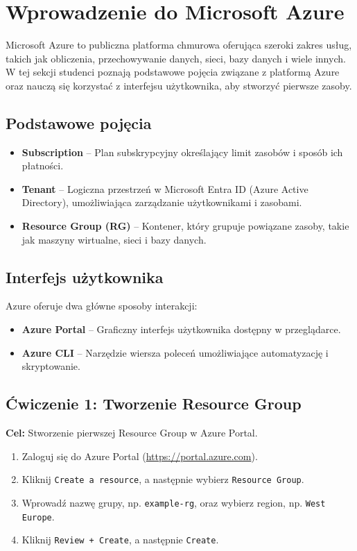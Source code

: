 \documentclass{article}
\begin{document}
\section{Wprowadzenie do Microsoft Azure}
Microsoft Azure to publiczna platforma chmurowa oferująca szeroki zakres usług, takich jak obliczenia, przechowywanie danych, sieci, bazy danych i wiele innych. W tej sekcji studenci poznają podstawowe pojęcia związane z platformą Azure oraz nauczą się korzystać z interfejsu użytkownika, aby stworzyć pierwsze zasoby.

\subsection{Podstawowe pojęcia}
\begin{itemize}
    \item \textbf{Subscription} – Plan subskrypcyjny określający limit zasobów i sposób ich płatności.
    \item \textbf{Tenant} – Logiczna przestrzeń w Microsoft Entra ID (Azure Active Directory), umożliwiająca zarządzanie użytkownikami i zasobami.
    \item \textbf{Resource Group (RG)} – Kontener, który grupuje powiązane zasoby, takie jak maszyny wirtualne, sieci i bazy danych.
\end{itemize}

\subsection{Interfejs użytkownika}
Azure oferuje dwa główne sposoby interakcji:
\begin{itemize}
    \item \textbf{Azure Portal} – Graficzny interfejs użytkownika dostępny w przeglądarce.
    \item \textbf{Azure CLI} – Narzędzie wiersza poleceń umożliwiające automatyzację i skryptowanie.
\end{itemize}

\subsection{Ćwiczenie 1: Tworzenie Resource Group}
\textbf{Cel:} Stworzenie pierwszej Resource Group w Azure Portal.

\begin{enumerate}
    \item Zaloguj się do Azure Portal (\url{https://portal.azure.com}).
    \item Kliknij \texttt{Create a resource}, a następnie wybierz \texttt{Resource Group}.
    \item Wprowadź nazwę grupy, np. \texttt{example-rg}, oraz wybierz region, np. \texttt{West Europe}.
    \item Kliknij \texttt{Review + Create}, a następnie \texttt{Create}.
\end{enumerate}
\end{document}
